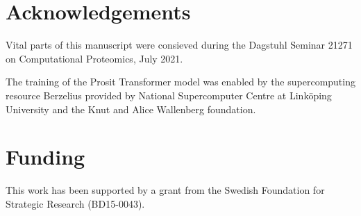 \documentclass[10pt,a4paper]{article}
\begin{document}
\section*{Acknowledgements}
Vital parts of this manuscript were consieved during the Dagstuhl Seminar 21271 on Computational Proteomics, July 2021.

The training of the Prosit Transformer model was enabled by the supercomputing resource Berzelius provided by National Supercomputer Centre at Linköping University and the Knut and Alice Wallenberg foundation.

\section*{Funding}

This work has been supported by a grant from the Swedish Foundation for Strategic Research (BD15-0043).




\end{document}
